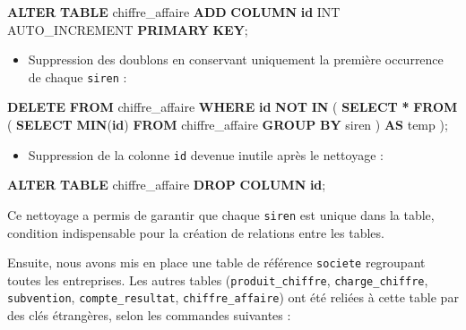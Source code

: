 \documentclass[mstat,12pt]{unswthesis}
\newenvironment{Shaded}{\begin{snugshade}}{\end{snugshade}}
\newcommand{\DataTypeTok}[1]{\textcolor[rgb]{0.13,0.29,0.53}{#1}}
\newcommand{\FunctionTok}[1]{\textcolor[rgb]{0.13,0.29,0.53}{\textbf{#1}}}
\newcommand{\KeywordTok}[1]{\textcolor[rgb]{0.13,0.29,0.53}{\textbf{#1}}}
\newcommand{\NormalTok}[1]{#1}
\newcommand{\OperatorTok}[1]{\textcolor[rgb]{0.81,0.36,0.00}{\textbf{#1}}}
\begin{document}
\begin{Shaded}
\begin{Highlighting}[]
\KeywordTok{ALTER} \KeywordTok{TABLE}\NormalTok{ chiffre\_affaire }\KeywordTok{ADD} \KeywordTok{COLUMN} \KeywordTok{id} \DataTypeTok{INT}\NormalTok{ AUTO\_INCREMENT }\KeywordTok{PRIMARY} \KeywordTok{KEY}\NormalTok{;}
\end{Highlighting}
\end{Shaded}

\begin{itemize}
\tightlist
\item
  Suppression des doublons en conservant uniquement la première
  occurrence de chaque \texttt{siren} :
\end{itemize}

\begin{Shaded}
\begin{Highlighting}[]
\KeywordTok{DELETE} \KeywordTok{FROM}\NormalTok{ chiffre\_affaire}
\KeywordTok{WHERE} \KeywordTok{id} \KeywordTok{NOT} \KeywordTok{IN}\NormalTok{ (}
    \KeywordTok{SELECT} \OperatorTok{*} \KeywordTok{FROM}\NormalTok{ (}
        \KeywordTok{SELECT} \FunctionTok{MIN}\NormalTok{(}\KeywordTok{id}\NormalTok{)}
        \KeywordTok{FROM}\NormalTok{ chiffre\_affaire}
        \KeywordTok{GROUP} \KeywordTok{BY}\NormalTok{ siren}
\NormalTok{    ) }\KeywordTok{AS}\NormalTok{ temp}
\NormalTok{);}
\end{Highlighting}
\end{Shaded}

\begin{itemize}
\tightlist
\item
  Suppression de la colonne \texttt{id} devenue inutile après le
  nettoyage :
\end{itemize}

\begin{Shaded}
\begin{Highlighting}[]
\KeywordTok{ALTER} \KeywordTok{TABLE}\NormalTok{ chiffre\_affaire }\KeywordTok{DROP} \KeywordTok{COLUMN} \KeywordTok{id}\NormalTok{;}
\end{Highlighting}
\end{Shaded}

Ce nettoyage a permis de garantir que chaque \texttt{siren} est unique
dans la table, condition indispensable pour la création de relations
entre les tables.

Ensuite, nous avons mis en place une table de référence \texttt{societe}
regroupant toutes les entreprises. Les autres tables
(\texttt{produit\_chiffre}, \texttt{charge\_chiffre},
\texttt{subvention}, \texttt{compte\_resultat},
\texttt{chiffre\_affaire}) ont été reliées à cette table par des clés
étrangères, selon les commandes suivantes :
\end{document}
